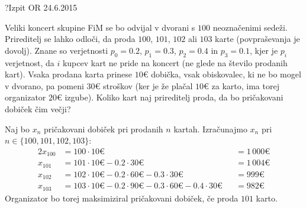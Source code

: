 \begin{naloga}{?}{Izpit OR 24.6.2015}
\begin{vprasanje}
Veliki koncert skupine FiM
se bo odvijal v dvorani s $100$ neoznačenimi sedeži.
Prireditelj se lahko odloči, da proda $100$, $101$, $102$ ali $103$ karte
(povpraševanja je dovolj).
Znane so verjetnosti $p_0 = 0.2$, $p_1 = 0.3$, $p_2 = 0.4$ in $p_3 = 0.1$,
kjer je $p_i$ verjetnost, da $i$ kupcev kart ne pride na koncert
(ne glede na število prodanih kart).
Vsaka prodana karta prinese $10 €$ dobička,
vsak obiskovalec, ki ne bo mogel v dvorano, pa pomeni $30 €$ stroškov
(ker je že plačal $10 €$ za karto, ima torej organizator $20 €$ izgube).
Koliko kart naj prireditelj proda, da bo pričakovani dobiček čim večji?
\end{vprasanje}

\begin{odgovor}
Naj bo $x_n$ pričakovani dobiček pri prodanih $n$ kartah.
Izračunajmo $x_n$ pri $n \in \{100, 101, 102, 103\}$:
\begin{alignat*}{2}
x_{100} &= 100 \cdot 10 € &&= 1\,000 € \\
x_{101} &= 101 \cdot 10 € - 0.2 \cdot 30 € &&= 1\,004 € \\
x_{102} &= 102 \cdot 10 € - 0.2 \cdot 60 € - 0.3 \cdot 30 € &&= 999 € \\
x_{103} &= 103 \cdot 10 € - 0.2 \cdot 90 € - 0.3 \cdot 60 € - 0.4 \cdot 30 €
&&= 982 €
\end{alignat*}
Organizator bo torej maksimiziral pričakovani dobiček,
če proda $101$ karto.
\end{odgovor}
\end{naloga}
